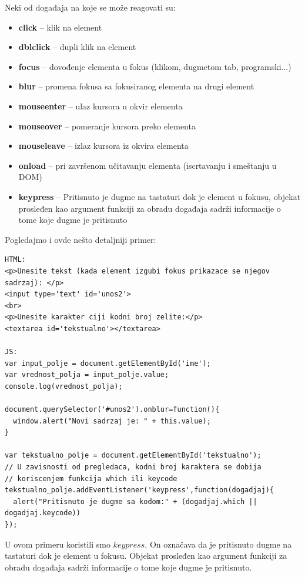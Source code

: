 \documentclass[a4paper]{article}
\begin{document}
Neki od događaja na koje se može reagovati su:
\begin{itemize}
\item \textbf{click} – klik na element
\item \textbf{dblclick} – dupli klik na element
\item \textbf{focus}  – dovođenje elementa u fokus (klikom, dugmetom tab, programski...)
\item \textbf{blur} – promena fokusa sa fokusiranog elementa na drugi element
\item \textbf{mouseenter}  – ulaz kursora u okvir elementa
\item \textbf{mouseover} – pomeranje kursora preko elementa
\item \textbf{mouseleave} – izlaz kursora iz okvira elementa
\item \textbf{onload} – pri završenom učitavanju elementa (iscrtavanju i smeštanju u DOM)
\item \textbf{keypress}  – Pritisnuto je dugme na tastaturi dok je element u fokusu, objekat prosleđen kao argument funkciji za obradu događaja sadrži informacije o tome koje dugme je
pritisnuto
\end{itemize}
Pogledajmo i ovde nešto detaljniji primer:
\begin{lstlisting}[backgroundcolor = \color{lightgray}]
HTML:
<p>Unesite tekst (kada element izgubi fokus prikazace se njegov sadrzaj): </p>
<input type='text' id='unos2'> 
<br>
<p>Unesite karakter ciji kodni broj zelite:</p>
<textarea id='tekstualno'></textarea>

JS:
var input_polje = document.getElementById('ime');
var vrednost_polja = input_polje.value;
console.log(vrednost_polja);

document.querySelector('#unos2').onblur=function(){            
  window.alert("Novi sadrzaj je: " + this.value);
}
            
var tekstualno_polje = document.getElementById('tekstualno');
// U zavisnosti od pregledaca, kodni broj karaktera se dobija
// koriscenjem funkcija which ili keycode
tekstualno_polje.addEventListener('keypress',function(dogadjaj){
  alert("Pritisnuto je dugme sa kodom:" + (dogadjaj.which || dogadjaj.keycode))
});
\end{lstlisting} 

U ovom primeru koristili smo $keypress$. On označava da je pritisnuto dugme na tastaturi dok je element u fokusu. Objekat prosleđen kao argument funkciji za obradu događaja sadrži informacije o tome koje dugme je pritisnuto.
\end{document}
